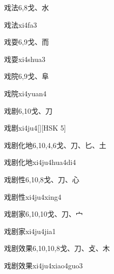 \begin{Entry}{戏法}{6,8}{⼽、⽔}
  \begin{Phonetics}{戏法}{xi4fa3}
  \end{Phonetics}
\end{Entry}

\begin{Entry}{戏耍}{6,9}{⼽、⽽}
  \begin{Phonetics}{戏耍}{xi4shua3}
  \end{Phonetics}
\end{Entry}

\begin{Entry}{戏院}{6,9}{⼽、⾩}
  \begin{Phonetics}{戏院}{xi4yuan4}
  \end{Phonetics}
\end{Entry}

\begin{Entry}{戏剧}{6,10}{⼽、⼑}
  \begin{Phonetics}{戏剧}{xi4ju4}[][HSK 5]
  \end{Phonetics}
\end{Entry}

\begin{Entry}{戏剧化地}{6,10,4,6}{⼽、⼑、⼔、⼟}
  \begin{Phonetics}{戏剧化地}{xi4ju4hua4di4}
  \end{Phonetics}
\end{Entry}

\begin{Entry}{戏剧性}{6,10,8}{⼽、⼑、⼼}
  \begin{Phonetics}{戏剧性}{xi4ju4xing4}
  \end{Phonetics}
\end{Entry}

\begin{Entry}{戏剧家}{6,10,10}{⼽、⼑、⼧}
  \begin{Phonetics}{戏剧家}{xi4ju4jia1}
  \end{Phonetics}
\end{Entry}

\begin{Entry}{戏剧效果}{6,10,10,8}{⼽、⼑、⽁、⽊}
  \begin{Phonetics}{戏剧效果}{xi4ju4xiao4guo3}
  \end{Phonetics}
\end{Entry}

